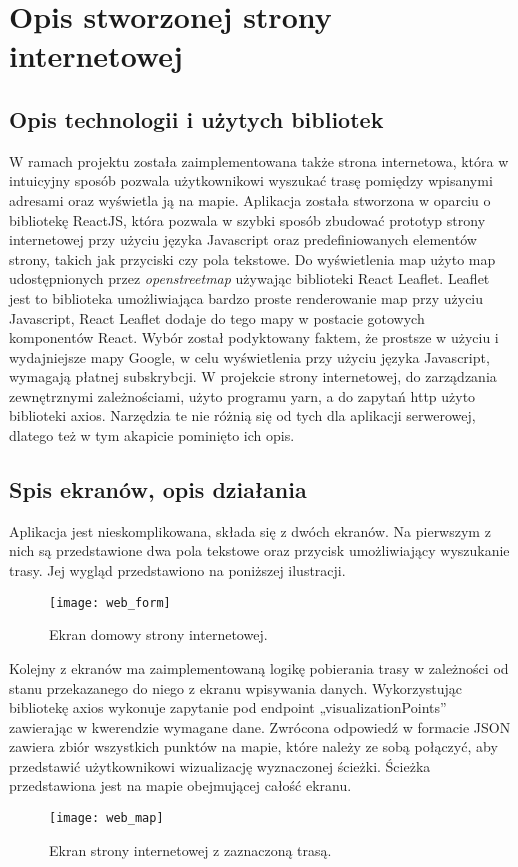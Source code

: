 \section{Opis stworzonej strony internetowej}

\subsection{Opis technologii i użytych bibliotek}

W ramach projektu została zaimplementowana także strona internetowa, która w intuicyjny sposób pozwala użytkownikowi wyszukać trasę pomiędzy wpisanymi adresami oraz wyświetla ją na mapie. 
Aplikacja została stworzona w oparciu o bibliotekę ReactJS, która pozwala w szybki sposób zbudować prototyp strony internetowej przy użyciu języka Javascript oraz predefiniowanych elementów strony, takich jak przyciski czy pola tekstowe. Do wyświetlenia map użyto map udostępnionych przez \textit{openstreetmap} używając biblioteki React Leaflet. Leaflet jest to biblioteka umożliwiająca bardzo proste renderowanie map przy użyciu Javascript, React Leaflet dodaje do tego mapy w postacie gotowych komponentów React. Wybór został podyktowany faktem, że prostsze w użyciu i wydajniejsze mapy Google, w celu wyświetlenia przy użyciu języka Javascript, wymagają płatnej subskrybcji.
W projekcie strony internetowej, do zarządzania zewnętrznymi zależnościami, użyto programu yarn, a do zapytań http użyto biblioteki axios. Narzędzia te nie różnią się od tych dla aplikacji serwerowej, dlatego też w tym akapicie pominięto ich opis.

\subsection{Spis ekranów, opis działania}

Aplikacja jest nieskomplikowana, składa się z dwóch ekranów. Na pierwszym z nich są przedstawione dwa pola tekstowe oraz przycisk umożliwiający wyszukanie trasy. Jej wygląd przedstawiono na poniższej ilustracji.

\begin{figure}[H]
\centering
\texttt{[image: web\_form]}
\caption{Ekran domowy strony internetowej.}
\end{figure}

Kolejny z ekranów ma zaimplementowaną logikę pobierania trasy w zależności od stanu przekazanego do niego z ekranu wpisywania danych. Wykorzystując bibliotekę axios wykonuje zapytanie pod endpoint „visualizationPoints” zawierając w kwerendzie wymagane dane. Zwrócona odpowiedź w formacie JSON zawiera zbiór wszystkich punktów na mapie, które należy ze sobą połączyć, aby przedstawić użytkownikowi wizualizację wyznaczonej ścieżki. Ścieżka przedstawiona jest na mapie obejmującej całość ekranu.

\begin{figure}[H]
\centering
\texttt{[image: web\_map]}
\caption{Ekran strony internetowej z zaznaczoną trasą.}
\end{figure}
